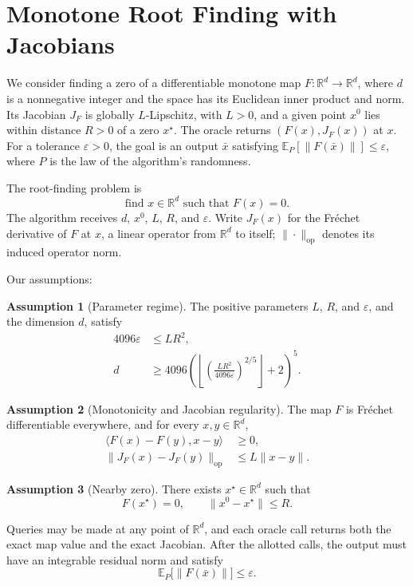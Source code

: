 \documentclass[10pt]{article}
\theoremstyle{definition}
\newtheorem{assumption}{Assumption}
\begin{document}
\section*{Monotone Root Finding with Jacobians}
We consider finding a zero of a differentiable monotone map $F:\mathbb{R}^d\to\mathbb{R}^d$, where $d$ is a nonnegative integer and the space has its Euclidean inner product and norm. Its Jacobian $J_F$ is globally $L$-Lipschitz, with $L>0$, and a given point $x^0$ lies within distance $R>0$ of a zero $x^\star$. The oracle returns $(F(x),J_F(x))$ at $x$. For a tolerance $\varepsilon>0$, the goal is an output $\bar{x}$ satisfying $\mathbb{E}_P[\|F(\bar{x})\|]\leq\varepsilon$, where $P$ is the law of the algorithm's randomness.

The root-finding problem is
\[
\text{find }x\in\mathbb{R}^d\text{ such that }F(x)=0.
\]
The algorithm receives $d$, $x^0$, $L$, $R$, and $\varepsilon$. Write $J_F(x)$ for the Fr\'echet derivative of $F$ at $x$, a linear operator from $\mathbb{R}^d$ to itself; $\|\cdot\|_{\mathrm{op}}$ denotes its induced operator norm.

Our assumptions:
\begin{assumption}[Parameter regime]
The positive parameters $L$, $R$, and $\varepsilon$, and the dimension $d$, satisfy
\[
\begin{aligned}
4096\varepsilon &\leq LR^2,\\
d &\geq 4096\left(
\left\lfloor\left(\frac{LR^2}{4096\varepsilon}\right)^{2/5}\right\rfloor+2
\right)^5.
\end{aligned}
\]
\end{assumption}

\begin{assumption}[Monotonicity and Jacobian regularity]
The map $F$ is Fr\'echet differentiable everywhere, and for every $x,y\in\mathbb{R}^d$,
\[
\begin{aligned}
\langle F(x)-F(y),x-y\rangle &\geq 0,\\
\|J_F(x)-J_F(y)\|_{\mathrm{op}} &\leq L\|x-y\|.
\end{aligned}
\]
\end{assumption}

\begin{assumption}[Nearby zero]
There exists $x^\star\in\mathbb{R}^d$ such that
\[
F(x^\star)=0,
\qquad
\|x^0-x^\star\|\leq R.
\]
\end{assumption}

Queries may be made at any point of $\mathbb{R}^d$, and each oracle call returns both the exact map value and the exact Jacobian. After the allotted calls, the output must have an integrable residual norm and satisfy
\[
\mathbb{E}_P\bigl[\|F(\bar{x})\|\bigr]\leq\varepsilon.
\]
\end{document}
